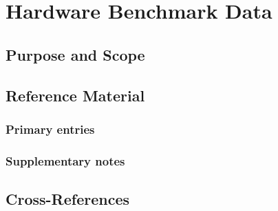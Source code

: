 \chapter{Hardware Benchmark Data}
\label{app:benchmarks}


\section{Purpose and Scope}
\label{sec:app_benchmarks:purpose}

\section{Reference Material}
\label{sec:app_benchmarks:reference}

\subsection{Primary entries}
\label{ssec:app_benchmarks:primary}

\subsection{Supplementary notes}
\label{ssec:app_benchmarks:supplementary}

\section{Cross-References}
\label{sec:app_benchmarks:xref}
